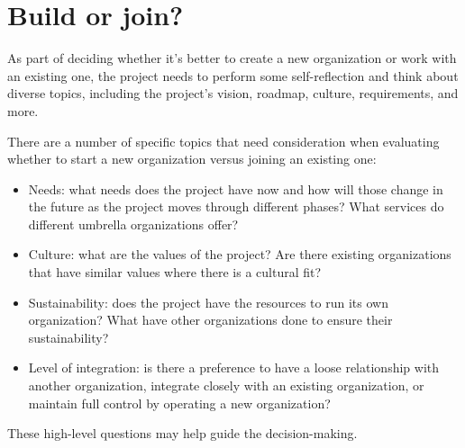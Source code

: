 


\chapter{Build or join?}

As part of deciding whether it's better to create a new organization or work with an existing one, the project needs to perform some self-reflection and think about diverse topics, including the project's vision, roadmap, culture, requirements, and more.

There are a number of specific topics that need consideration when evaluating whether to start a new organization versus joining an existing one:

\begin{itemize}

\item Needs: what needs does the project have now and how will those change in the future as the project moves through different phases?  What services do different umbrella organizations offer?

\item Culture: what are the values of the project?  Are there existing organizations that have similar values where there is a cultural fit?

\item Sustainability: does the project have the resources to run its own organization?  What have other organizations done to ensure their sustainability?

\item Level of integration: is there a preference to have a loose relationship with another organization, integrate closely with an existing organization, or maintain full control by operating a new organization?

\end{itemize}

These high-level questions may help guide the decision-making.

